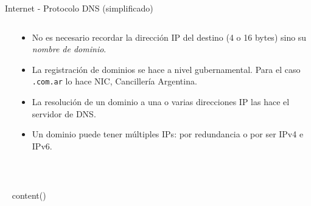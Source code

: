 \begin{frame}[fragile]{Internet - Protocolo DNS (simplificado)}
   \begin{columns}
       \begin{column}{.4\linewidth}
       \end{column}
      \begin{column}{.6\linewidth}
        \begin{itemize}
            \item<1-> No es necesario recordar la direcci\'on IP del destino (4 o 16 bytes) sino su \textit{nombre de dominio}.
            \item<2-> La registraci\'on de dominios se hace a nivel gubernamental. Para el caso \lstinline[style=normal]!.com.ar! lo hace NIC, Canciller\'ia Argentina.
            \item<3-> La resoluci\'on de un dominio a una o varias direcciones IP las hace el servidor de DNS.
            \item<4-> Un dominio puede tener m\'ultiples IPs: por redundancia o por ser IPv4 e IPv6.
        \end{itemize}
      \end{column}
   \end{columns}
\end{frame}

~%

~{ content() }~


